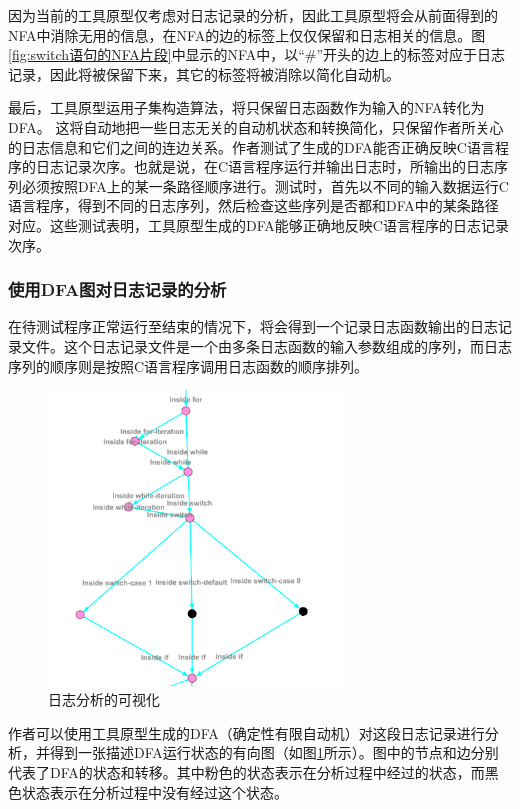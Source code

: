 因为当前的工具原型仅考虑对日志记录的分析，因此工具原型将会从前面得到的NFA中消除无用的信息，在NFA的边的标签上仅仅保留和日志相关的信息。图\ref{fig:switch语句的NFA片段}中显示的NFA中，以“\#”开头的边上的标签对应于日志记录，因此将被保留下来，其它的标签将被消除以简化自动机。

最后，工具原型运用子集构造算法，将只保留日志函数作为输入的NFA转化为DFA。
这将自动地把一些日志无关的自动机状态和转换简化，只保留作者所关心的日志信息和它们之间的连边关系。作者测试了生成的DFA能否正确反映C语言程序的日志记录次序。也就是说，在C语言程序运行并输出日志时，所输出的日志序列必须按照DFA上的某一条路径顺序进行。测试时，首先以不同的输入数据运行C语言程序，得到不同的日志序列，然后检查这些序列是否都和DFA中的某条路径对应。这些测试表明，工具原型生成的DFA能够正确地反映C语言程序的日志记录次序。

\subsubsection{使用DFA图对日志记录的分析}

在待测试程序正常运行至结束的情况下，将会得到一个记录日志函数输出的日志记录文件。这个日志记录文件是一个由多条日志函数的输入参数组成的序列，而日志序列的顺序则是按照C语言程序调用日志函数的顺序排列。

\begin{figure}[htbp]
	\centering
	\includegraphics[width=0.7\textwidth]{pictures/正常日志分析(片段).png}
	\caption{日志分析的可视化}
	\label{fig:日志分析的可视化}
\end{figure}

作者可以使用工具原型生成的DFA（确定性有限自动机）对这段日志记录进行分析，并得到一张描述DFA运行状态的有向图（如图\ref{fig:日志分析的可视化}所示）。图中的节点和边分别代表了DFA的状态和转移。其中粉色的状态表示在分析过程中经过的状态，而黑色状态表示在分析过程中没有经过这个状态。

